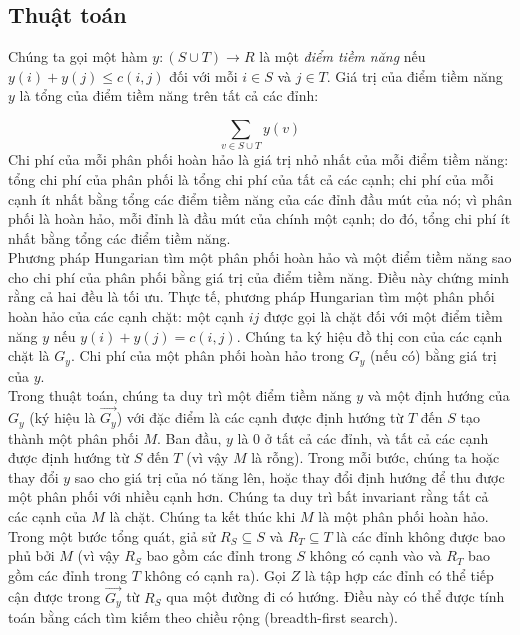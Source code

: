 \subsection{Thuật toán}
Chúng ta gọi một hàm \( y: (S \cup T) \to R \) là một \textit{điểm tiềm năng} nếu \( y(i) + y(j) \leq c(i, j) \) đối với mỗi \( i \in S \) và \( j \in T \). Giá trị của điểm tiềm năng \( y \) là tổng của điểm tiềm năng trên tất cả các đỉnh:

\[
\sum_{v \in S \cup T} y(v)
\]
Chi phí của mỗi phân phối hoàn hảo là giá trị nhỏ nhất của mỗi điểm tiềm năng: tổng chi phí của phân phối là tổng chi phí của tất cả các cạnh; chi phí của mỗi cạnh ít nhất bằng tổng các điểm tiềm năng của các đỉnh đầu mút của nó; vì phân phối là hoàn hảo, mỗi đỉnh là đầu mút của chính một cạnh; do đó, tổng chi phí ít nhất bằng tổng các điểm tiềm năng.\\
Phương pháp Hungarian tìm một phân phối hoàn hảo và một điểm tiềm năng sao cho chi phí của phân phối bằng giá trị của điểm tiềm năng. Điều này chứng minh rằng cả hai đều là tối ưu. Thực tế, phương pháp Hungarian tìm một phân phối hoàn hảo của các cạnh chặt: một cạnh \( ij \) được gọi là chặt đối với một điểm tiềm năng \( y \) nếu \( y(i) + y(j) = c(i, j) \). Chúng ta ký hiệu đồ thị con của các cạnh chặt là \( G_y \). Chi phí của một phân phối hoàn hảo trong \( G_y \) (nếu có) bằng giá trị của \( y \).\\
Trong thuật toán, chúng ta duy trì một điểm tiềm năng \( y \) và một định hướng của \( G_y \) (ký hiệu là \( \overrightarrow{G_y} \)) với đặc điểm là các cạnh được định hướng từ \( T \) đến \( S \) tạo thành một phân phối \( M \). Ban đầu, \( y \) là 0 ở tất cả các đỉnh, và tất cả các cạnh được định hướng từ \( S \) đến \( T \) (vì vậy \( M \) là rỗng). Trong mỗi bước, chúng ta hoặc thay đổi \( y \) sao cho giá trị của nó tăng lên, hoặc thay đổi định hướng để thu được một phân phối với nhiều cạnh hơn. Chúng ta duy trì bất invariant rằng tất cả các cạnh của \( M \) là chặt. Chúng ta kết thúc khi \( M \) là một phân phối hoàn hảo.\\
Trong một bước tổng quát, giả sử \( R_S \subseteq S \) và \( R_T \subseteq T \) là các đỉnh không được bao phủ bởi \( M \) (vì vậy \( R_S \) bao gồm các đỉnh trong \( S \) không có cạnh vào và \( R_T \) bao gồm các đỉnh trong \( T \) không có cạnh ra). Gọi \( Z \) là tập hợp các đỉnh có thể tiếp cận được trong \( \overrightarrow{G_y} \) từ \( R_S \) qua một đường đi có hướng. Điều này có thể được tính toán bằng cách tìm kiếm theo chiều rộng (breadth-first search).

